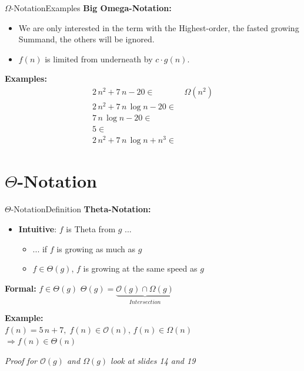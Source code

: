 \begin{frame}{$\Omega$-Notation}{Examples}
  \textbf{Big Omega-Notation:}
  \begin{itemize}
    \item
      We are only interested in the term with the Highest-order, the fasted growing Summand,
      the others will be ignored.
    \item
      $f(n)$ is limited {\color{Mittel-Blau}from underneath} by
      $c \cdot g(n)$.\\
  \end{itemize}
  \textbf{Examples:}
  \begin{align*}
    2 \, n^2 + 7 \, n - 20 \in & \,\Omega(n^2)\\
    2 \, n^2 + 7 \, n \, \log n - 20 \in & {}\\
    7 \, n \, \log n - 20 \in & {}\\
    5 \in & {}\\
    2 \, n^2 + 7 \, n \, \log n + n^3 \in & {}
  \end{align*}
\end{frame}


\section{\texorpdfstring{$\Theta$}{Theta}-Notation}

\begin{frame}{$\Theta$-Notation}{Definition}
  \textbf{Theta-Notation:}
  \begin{itemize}
    \item
      \textbf{Intuitive}: $f$ is Theta from $g$ ...\\
        \begin{itemize}
            \item
              ... if $f$ is growing as much as $g$
            \item
              $f \in \Theta(g)$, $f$ is growing at the same speed as $g$
       \end{itemize}
  \end{itemize}
 	\begin{block}{\textbf{Formal:} $f \in \Theta(g)$}
 		$\Theta(g) = \underbrace{\mathcal O(g) \cap \Omega(g)}_{Intersection}$
 	\end{block}
  \textbf{Example:}\\
  \hspace*{1.5em}$f(n) = 5 \, n + 7, \;
    f(n) \in \mathcal{O}(n), \,
    f(n) \in \Omega(n)$\\
  \hspace*{3.0em}$\Rightarrow f(n) \in \Theta(n)$\\[0.5em]
  \begin{center}
   \textit{Proof for $\mathcal{O}(g)$ and $\Omega(g)$ look at slides 14 and 19}
  \end{center}
\end{frame}

